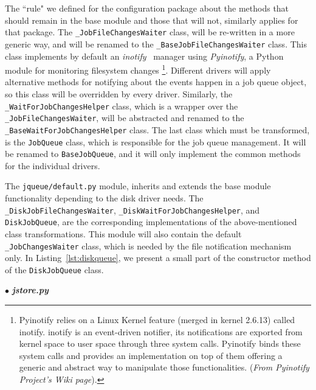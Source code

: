 \begin{description}
    The ``rule" we defined for the configuration package about the methods that
    should remain in the base module and those that will not, similarly applies
    for that package. The \texttt{\_JobFileChangesWaiter} class, will be
    re-written in a more generic way, and will be renamed to the
    \texttt{\_BaseJobFileChangesWaiter} class. This class implements by default
    an \emph{inotify}~ manager using
    \emph{Pyinotify}, a Python module for monitoring filesystem changes
    \footnote{Pyinotify relies on a Linux Kernel feature (merged in kernel
    2.6.13) called inotify. inotify is an event-driven notifier, its
    notifications are exported from kernel space to user space through three
    system calls. Pyinotify binds these system calls and provides an
    implementation on top of them offering a generic and abstract way to
    manipulate those functionalities. (\emph{From Pyinotify Project's Wiki
    page}).}. Different drivers will apply alternative methods for notifying
    about the events happen in a job queue object, so this class will be
    overridden by every driver. Similarly, the \texttt{\_WaitForJobChangesHelper}
    class, which is a wrapper over the \texttt{\_JobFileChangesWaiter}, will be
    abstracted and renamed to the \texttt{\_BaseWaitForJobChangesHelper} class.
    The last class which must be transformed, is the \texttt{JobQueue} class,
    which is responsible for the job queue management. It will be renamed to
    \texttt{BaseJobQueue}, and it will only implement the common methods for the
    individual drivers.

    The \texttt{jqueue/default.py} module, inherits and extends the base module
    functionality depending to the disk driver needs. The
    \texttt{\_DiskJobFileChangesWaiter}, \texttt{\_DiskWaitForJobChangesHelper},
    and \texttt{DiskJobQueue}, are the corresponding implementations of the
    above-mentioned class transformations. This module will also contain the
    default \texttt{\_JobChangesWaiter} class, which is needed by the file
    notification mechanism only. In Listing~\ref{lst:diskqueue}, we present a
    small part of the constructor method of the \texttt{DiskJobQueue} class.


    \smallskip
    $\bullet$ \emph{\textbf{{\Large{jstore.py}}}} \\


\end{description}
